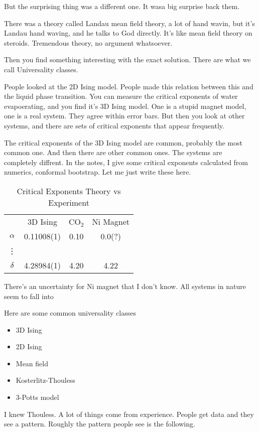 But the surprising thing was a different one.
It wasa big surprise back them.

There was a theory called Landau mean field theory,
a lot of hand wavin,
but it's Landau hand waving,
and he talks to God directly.
It's like mean field theory on steroids.
Tremendous theory,
no argument whatsoever.

Then you find something interesting with the exact solution.
There are what we call Universality classes.

People looked at the 2D Ising model.
People made this relation between this and the liquid phase transition.
You can measure the critical exponents of water evapoerating,
and you find it's 3D Ising model.
One is a stupid magnet model,
one is a real system.
They agree within error bars.
But then you look at other systems,
and there are sets of critical exponents that appear frequently.

The critical exponents of the 3D Ising model are common,
probably the most common one.
And then there are other common ones.
The systems are completely diffrent.
In the notes,
I give some critical exponents calculated from numerics,
conformal bootstrap.
Let me just write these here.
\begin{table}
    \centering
    \begin{tabular}{cccc}
        & 3D Ising & CO$_2$ & Ni Magnet\\
        $\alpha$ & 0.11008(1) & 0.10 & 0.0(?)\\
        \vdots\\
        $\delta$ & 4.28984(1) & 4.20 & 4.22
    \end{tabular}
    \caption{Critical Exponents Theory vs Experiment}%
    \label{tab:criticalexponents}
\end{table}
There's an uncertainty for Ni magnet that I don't know.
All systems in nature seem to fall into 

Here are some common universality classes
\begin{itemize}
    \item 3D Ising
    \item 2D Ising
    \item Mean field
    \item Kosterlitz-Thouless
    \item 3-Potts model
\end{itemize}
I knew Thouless.
A lot of things come from experience.
People get data and they see a pattern.
Roughly the pattern people see is the following.

